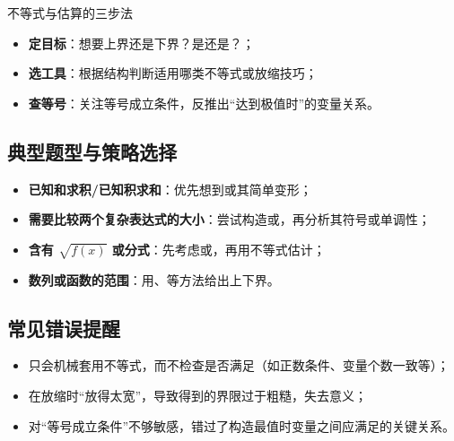 \documentclass[a4paper,11pt]{ctexart}
\begin{document}
\begin{center}

\vspace{0.5em}
\end{center}

\begin{summarybox}{不等式与估算的三步法}
\begin{itemize}
  \item \textbf{定目标}：想要上界还是下界？是还是？；
  \item \textbf{选工具}：根据结构判断适用哪类不等式或放缩技巧；
  \item \textbf{查等号}：关注等号成立条件，反推出“达到极值时”的变量关系。
\end{itemize}
\end{summarybox}

\subsection{典型题型与策略选择}

\begin{itemize}
  \item \textbf{已知和求积/已知积求和}：优先想到或其简单变形；
  \item \textbf{需要比较两个复杂表达式的大小}：尝试构造或，再分析其符号或单调性；
  \item \textbf{含有 $\sqrt{f(x)}$ 或分式}：先考虑或，再用不等式估计；
  \item \textbf{数列或函数的范围}：用、等方法给出上下界。
\end{itemize}

\subsection{常见错误提醒}

\begin{itemize}
  \item 只会机械套用不等式，而不检查是否满足（如正数条件、变量个数一致等）；
  \item 在放缩时“放得太宽”，导致得到的界限过于粗糙，失去意义；
  \item 对“等号成立条件”不够敏感，错过了构造最值时变量之间应满足的关键关系。
\end{itemize}
\end{document}
